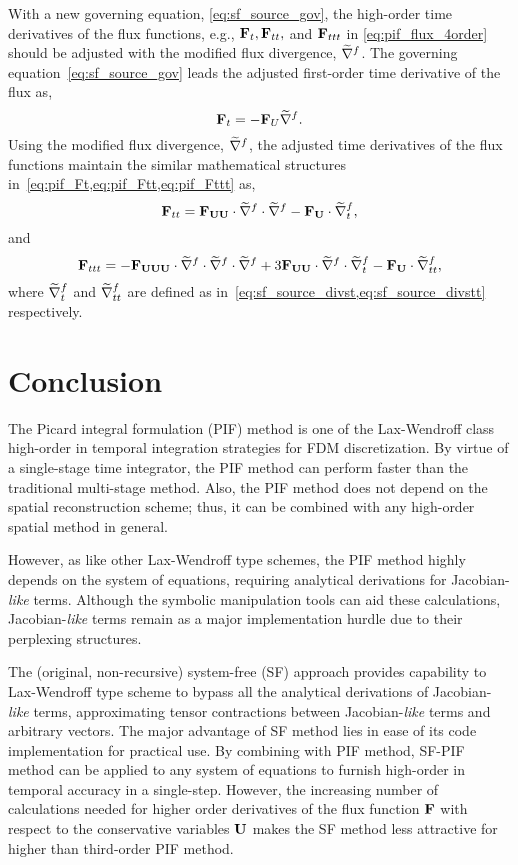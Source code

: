 With a new governing equation, \cref{eq:sf_source_gov},
the high-order time derivatives of the flux functions, e.g., \( \mathbf{F}_{t}, \mathbf{F}_{tt}, \) and \( \mathbf{F}_{ttt} \)
in \cref{eq:pif_flux_4order}
should be adjusted with the modified flux divergence, \( \widetilde{\nabla}^{f} \).
The governing equation~\cref{eq:sf_source_gov} leads
the adjusted first-order time derivative of the flux as,
\begin{equation}\label{eq:sf_source_Ft}
    \mathbf{F}_{t} = -\mathbf{F}_{U} \widetilde{\nabla}^{f}.
\end{equation}
Using the modified flux divergence, \( \widetilde{\nabla}^{f} \), the adjusted time derivatives of the flux functions
maintain the similar mathematical structures in~\cref{eq:pif_Ft,eq:pif_Ftt,eq:pif_Fttt} as,
\begin{equation}\label{eq:sf_source_Ftt}
    \mathbf{F}_{tt} = \mathbf{F}_{\mathbf{U} \mathbf{U}} \cdot \widetilde{\nabla}^{f} \cdot \widetilde{\nabla}^{f} - \mathbf{F}_{\mathbf{U}} \cdot \widetilde{\nabla}^{f}_{t},
\end{equation}
and
\begin{equation}\label{eq:sf_source_Fttt}
    \mathbf{F}_{ttt} = -\mathbf{F}_{\mathbf{U} \mathbf{U} \mathbf{U}} \cdot \widetilde{\nabla}^{f} \cdot \widetilde{\nabla}^{f} \cdot \widetilde{\nabla}^{f}
    + 3 \mathbf{F}_{\mathbf{U} \mathbf{U}} \cdot \widetilde{\nabla}^{f} \cdot \widetilde{\nabla}^{f}_{t}
    - \mathbf{F}_{\mathbf{U}} \cdot \widetilde{\nabla}^{f}_{tt},
\end{equation}
where \( \widetilde{\nabla}^{f}_{t} \) and \( \widetilde{\nabla}^{f}_{tt} \) are defined as in~\cref{eq:sf_source_divst,eq:sf_source_divstt} respectively.




\section{Conclusion}\label{sec:sf_conclusion}

The Picard integral formulation (PIF) method is one of the Lax-Wendroff class
high-order in temporal integration strategies for FDM discretization.
By virtue of a single-stage time integrator, the PIF method can perform
faster than the traditional multi-stage method.
Also, the PIF method does not depend on the spatial reconstruction scheme;
thus, it can be combined with any high-order spatial method in general.

However, as like other Lax-Wendroff type schemes,
the PIF method highly depends on the system of equations,
requiring analytical derivations for Jacobian-\textit{like} terms.
Although the symbolic manipulation tools can aid these calculations,
Jacobian-\textit{like} terms remain as a major implementation hurdle due to their perplexing structures.

The (original, non-recursive) system-free (SF) approach provides capability
to Lax-Wendroff type scheme to bypass all the analytical derivations of Jacobian-\textit{like} terms,
approximating tensor contractions between Jacobian-\textit{like} terms and arbitrary vectors.
The major advantage of SF method lies in ease of its code implementation for practical use.
By combining with PIF method, SF-PIF method can be applied to any system of equations
to furnish high-order in temporal accuracy in a single-step.
However, the increasing number of calculations needed for
higher order derivatives of the flux function \( \mathbf{F} \) with respect to the conservative variables \( \mathbf{U} \)
makes the SF method less attractive for higher than third-order PIF method.

